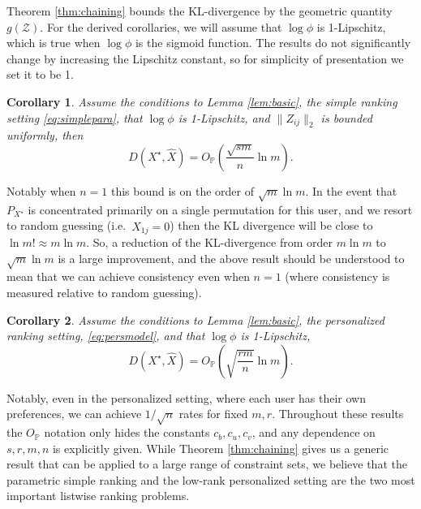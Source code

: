 \documentclass{article}
\newtheorem{corollary}{Corollary}
\begin{document}
Theorem \ref{thm:chaining} bounds the KL-divergence by the geometric quantity $g(\mathcal Z)$.
For the derived corollaries, we will assume that $\log \phi$ is 1-Lipschitz, which is true when $\log \phi$ is the sigmoid function.
The results do not significantly change by increasing the Lipschitz constant, so for simplicity of presentation we set it to be 1.

\begin{corollary}
\label{cor:simple}
Assume the conditions to Lemma \ref{lem:basic}, the simple ranking setting \eqref{eq:simplepara}, that $\log \phi$ is 1-Lipschitz, and $\|Z_{ij}\|_2$ is bounded uniformly, then
$$
D(X^\star,\hat X) = O_{\mathbb P} \left( \frac{\sqrt{sm}}{n} \ln m\right).
$$
\end{corollary}

Notably when $n=1$ this bound is on the order of $\sqrt m \ln m$.
In the event that $P_{X^\star}$ is concentrated primarily on a single permutation for this user, and we resort to random guessing (i.e.~$\hat X_{1j} = 0$) then the KL divergence will be close to $\ln m! \approx m \ln m$.  
So, a reduction of the KL-divergence from order $m \ln m$ to $\sqrt m \ln m$ is a large improvement, and the above result should be understood to mean that we can achieve consistency even when $n=1$ (where consistency is measured relative to random guessing).

\begin{corollary}
\label{cor:person}
Assume the conditions to Lemma \ref{lem:basic}, the personalized ranking setting, \eqref{eq:persmodel}, and that $\log \phi$ is 1-Lipschitz,
$$
D(X^\star,\hat X) = O_{\mathbb P} \left( \sqrt{\frac{rm}{n}}\ln m\right).
$$
\end{corollary}

Notably, even in the personalized setting, where each user has their own preferences, we can achieve $1/\sqrt n$ rates for fixed $m,r$.
Throughout these results the $O_{\mathbb P}$ notation only hides the constants $c_b, c_u, c_v$, and any dependence on $s,r,m,n$ is explicitly given.
While Theorem \ref{thm:chaining} gives us a generic result that can be applied to a large range of constraint sets, we believe that the parametric simple ranking and the low-rank personalized setting are the two most important listwise ranking problems.
\end{document}
